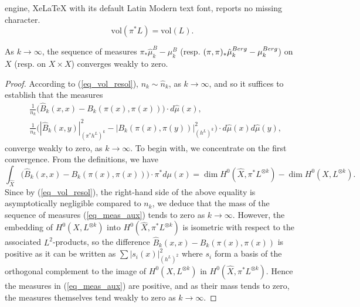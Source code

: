 \documentclass[10pt,a4paper]{amsart}
\begin{document}
engine, XeLaTeX with its default Latin Modern text font, reports no missing character.
	\begin{equation}\label{eq_vol_resol}
    	\mathrm{vol}(\pi^* L) = \mathrm{vol}(L).
	\end{equation}

	\begin{lem}\label{lem_comp_res_meas}
		As $k \to \infty$, the sequence of measures $\pi_* \hat{\mu}_k^B - \mu_k^B$ (resp. $(\pi, \pi)_* \hat{\mu}_k^{\rm{Berg}} - \mu_k^{\rm{Berg}}$) on $X$ (resp. on $X \times X$) converges weakly to zero.
	\end{lem}

	\begin{proof}
		According to (\ref{eq_vol_resol}), $n_k \sim \hat{n}_k$, as $k \to \infty$, and so it suffices to establish that the measures
		\begin{equation}\label{eq_meas_aux}
		\begin{aligned}
			&
			\frac{1}{n_k} \Big( \hat{B}_k(x, x) - B_k(\pi(x), \pi(x)) \Big) \cdot d \hat{\mu}(x),
			\\
			&
			\frac{1}{n_k} \Big( |\hat{B}_k(x, y)|^2_{(\pi^* h^L)^k} - |B_k(\pi(x), \pi(y))|^2_{(h^L)^k} \Big) \cdot d \hat{\mu}(x) d \hat{\mu}(y),
		\end{aligned}
		\end{equation}
		converge weakly to zero, as $k \to \infty$.
		To begin with, we concentrate on the first convergence.
		From the definitions, we have 
		\begin{equation}
			\int_{\hat{X}}  \Big( \hat{B}_k(x, x) - B_k(\pi(x), \pi(x)) \Big) \cdot \pi^* d \mu(x)
			=
			\dim H^0(\hat{X}, \pi^* L^{\otimes k})
			-
			\dim H^0(X, L^{\otimes k}).
		\end{equation}
		Since by (\ref{eq_vol_resol}), the right-hand side of the above equality is asymptotically negligible compared to $n_k$, we deduce that the mass of the sequence of measures (\ref{eq_meas_aux}) tends to zero as $k \to \infty$.  
		However, the embedding of $H^0(X, L^{\otimes k})$ into $H^0(\hat{X}, \pi^* L^{\otimes k})$ is isometric with respect to the associated $L^2$-products, so the difference $\hat{B}_k(x, x) - B_k(\pi(x), \pi(x))$ is positive as it can be written as $\sum |s_i(x)|^2_{(h^L)^2}$ where $s_i$ form a basis of the orthogonal complement to the image of $H^0(X, L^{\otimes k})$ in $H^0(\hat{X}, \pi^* L^{\otimes k})$. 
		Hence the measures in (\ref{eq_meas_aux}) are positive, and as their mass tends to zero, the measures themselves tend weakly to zero as $k \to \infty$.

\end{proof}
\end{document}
